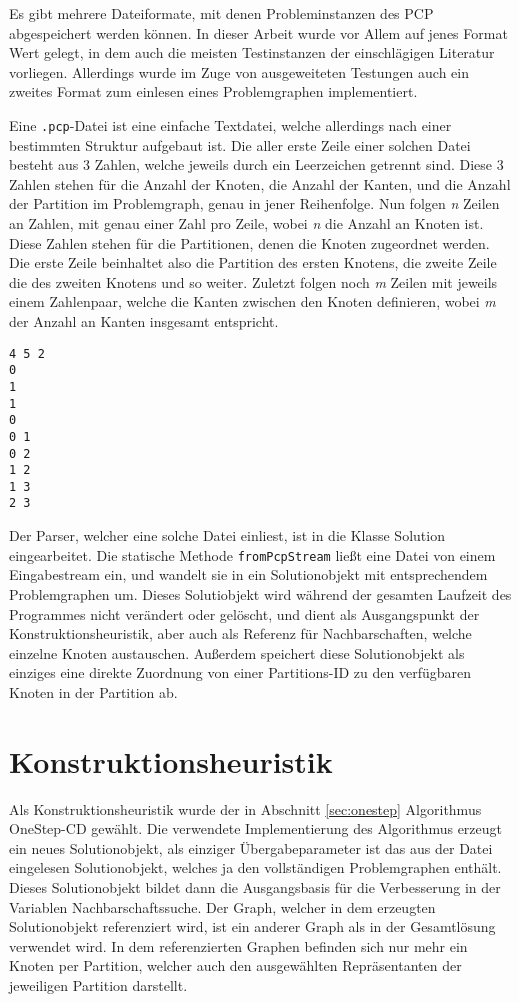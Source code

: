 Es gibt mehrere Dateiformate, mit denen Probleminstanzen des PCP abgespeichert werden können. In dieser Arbeit wurde vor Allem auf jenes
Format Wert gelegt, in dem auch die meisten Testinstanzen der einschlägigen Literatur vorliegen. Allerdings wurde im Zuge von ausgeweiteten 
Testungen auch ein zweites Format zum einlesen eines Problemgraphen implementiert. 

Eine \texttt{.pcp}-Datei ist eine einfache Textdatei, welche allerdings nach einer bestimmten Struktur aufgebaut ist. Die aller erste Zeile
einer solchen Datei besteht aus 3 Zahlen, welche jeweils durch ein Leerzeichen getrennt sind. Diese 3 Zahlen stehen für die Anzahl der Knoten, 
die Anzahl der Kanten, und die Anzahl der Partition im Problemgraph, genau in jener Reihenfolge. Nun folgen \textit{n} Zeilen an Zahlen, mit 
genau einer Zahl pro Zeile, wobei \textit{n} die Anzahl an Knoten ist. Diese Zahlen stehen für die Partitionen, denen die Knoten zugeordnet werden.
Die erste Zeile beinhaltet also die Partition des ersten Knotens, die zweite Zeile die des zweiten Knotens und so weiter. Zuletzt folgen noch
\textit{m} Zeilen mit jeweils einem Zahlenpaar, welche die Kanten zwischen den Knoten definieren, wobei \textit{m} der Anzahl an Kanten insgesamt
entspricht.

\singlespacing
\begin{lstlisting}[caption={Eine einfache \textit{.pcp}-Beispieldatei},label={lst:pcp}]
4 5 2
0
1
1
0
0 1
0 2
1 2
1 3
2 3
\end{lstlisting}

Der Parser, welcher eine solche Datei einliest, ist in die Klasse Solution eingearbeitet. Die statische Methode \texttt{fromPcpStream} ließt eine
Datei von einem Eingabestream ein, und wandelt sie in ein Solutionobjekt mit entsprechendem Problemgraphen um. Dieses Solutiobjekt wird während
der gesamten Laufzeit des Programmes nicht verändert oder gelöscht, und dient als Ausgangspunkt der Konstruktionsheuristik, aber auch als
Referenz für Nachbarschaften, welche einzelne Knoten austauschen. Außerdem speichert diese Solutionobjekt als einziges eine direkte Zuordnung von einer Partitions-ID
zu den verfügbaren Knoten in der Partition ab. 

\section{Konstruktionsheuristik}
Als Konstruktionsheuristik wurde der in Abschnitt \ref{sec:onestep} Algorithmus OneStep-CD gewählt. Die verwendete Implementierung des Algorithmus
erzeugt ein neues Solutionobjekt, als einziger Übergabeparameter ist das aus der Datei eingelesen Solutionobjekt, welches ja den vollständigen Problemgraphen
enthält. Dieses Solutionobjekt bildet dann die Ausgangsbasis für die Verbesserung in der Variablen Nachbarschaftssuche. Der Graph, welcher in dem erzeugten Solutionobjekt
referenziert wird, ist ein anderer Graph als in der Gesamtlösung verwendet wird. In dem referenzierten Graphen befinden sich nur mehr ein Knoten per Partition, welcher auch den ausgewählten Repräsentanten der jeweiligen Partition darstellt.

